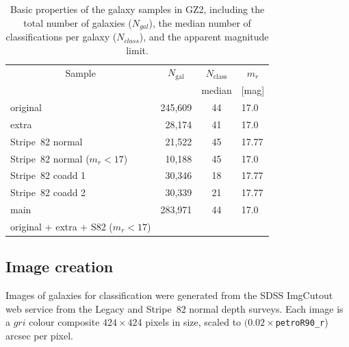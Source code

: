 \documentclass[useAMS,usenatbib]{mn2e}
\providecommand{\DIFaddtex}[1]{{\protect\color{blue}\uwave{#1}}} %
\providecommand{\DIFdeltex}[1]{{\protect\color{red}\sout{#1}}}                      %
\providecommand{\DIFaddFL}[1]{\DIFadd{#1}} %
\providecommand{\DIFdelFL}[1]{\DIFdel{#1}} %
\providecommand{\DIFaddbeginFL}{} %
\providecommand{\DIFaddendFL}{} %
\providecommand{\DIFdelbeginFL}{} %
\providecommand{\DIFdelendFL}{} %
\providecommand{\DIFadd}[1]{\texorpdfstring{\DIFaddtex{#1}}{#1}} %
\providecommand{\DIFdel}[1]{\texorpdfstring{\DIFdeltex{#1}}{}} %
\begin{document}
\begin{table}
 \begin{tabular}{@{}lrcl}
 \hline
\multicolumn{1}{c}{Sample} &
\DIFdelbeginFL %
\DIFdelendFL \DIFaddbeginFL \multicolumn{1}{c}{$N_\mathrm{gal}$} \DIFaddendFL &
\DIFdelbeginFL %
\DIFdelendFL \DIFaddbeginFL \multicolumn{1}{c}{$N_\mathrm{class}$} \DIFaddendFL &
\multicolumn{1}{c}{$m_r$} 
\\ 
\multicolumn{1}{c}{} &
\multicolumn{1}{c}{} &
\multicolumn{1}{c}{median} &
\multicolumn{1}{c}{[mag]} 
\\ 
\hline
\hline						
original                       & 245,609 & 44  & 17.0   \\     %
extra                          &  28,174 & 41  & 17.0   \\     %
Stripe~82 normal               &  21,522 & 45  & 17.77  \\     %
Stripe~82 normal ($m_r<17$)    &  10,188 & 45  & 17.0   \\     %
Stripe~82 coadd 1              &  30,346 & 18  & 17.77  \\     %
Stripe~82 coadd 2              &  30,339 & 21  & 17.77  \\     %
\hline
main                           & 283,971 & 44  & 17.0   \\     %
original + extra + S82 ($m_r<17$) & \\
\hline
 \end{tabular}
 \caption{Basic properties of the galaxy samples in GZ2, including the total number of galaxies (\DIFdelbeginFL \DIFdelFL{$N_{gal}$}\DIFdelendFL \DIFaddbeginFL \DIFaddFL{$N_\mathrm{gal}$}\DIFaddendFL ), the median number of classifications per galaxy (\DIFdelbeginFL \DIFdelFL{$N_{class}$}\DIFdelendFL \DIFaddbeginFL \DIFaddFL{$N_\mathrm{class}$}\DIFaddendFL ), and the apparent magnitude limit. \label{tbl-sample}}
\end{table}

\subsection{Image creation}\label{ssec-imagecreation}

Images of galaxies for classification were generated from the SDSS ImgCutout web service \citep{nie04} from the Legacy and Stripe~82 normal depth surveys. Each image is a $gri$ colour composite $424\times424$ pixels in size, scaled to $(0.02\times${\tt petroR90\_r}) arcsec per pixel.
\end{document}
